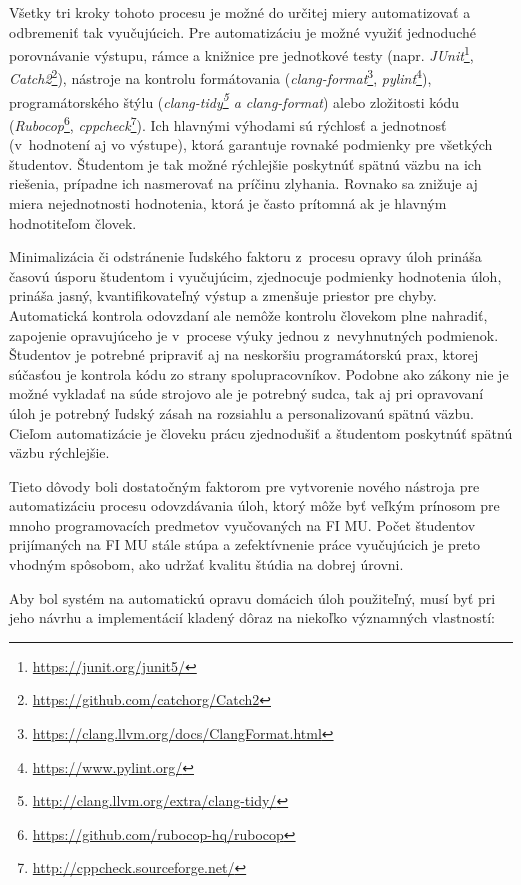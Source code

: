 \documentclass[
  digital, %
  oneside, %
  table,   %
  lof,     %
  lot,   %
]{fithesis3}
\newcommand*{\footurl}[1]{\footnote{\url{#1}}}
\begin{document}
Všetky tri kroky tohoto procesu je možné do určitej miery automatizovať a odbremeniť tak vyučujúcich. Pre automatizáciu je možné využiť jednoduché porovnávanie výstupu, rámce a knižnice pre jednotkové testy (napr. \emph{JUnit}\footnote{\url{https://junit.org/junit5/}}, \emph{Catch2}\footnote{\url{https://github.com/catchorg/Catch2}}), nástroje na kontrolu formátovania (\emph{clang-format}\footnote{\url{https://clang.llvm.org/docs/ClangFormat.html}}, \textit{pylint}\footnote{\url{https://www.pylint.org/}}), programátorského štýlu (\textit{clang-tidy\footnote{\url{http://clang.llvm.org/extra/clang-tidy/}} a clang-format}) alebo zložitosti kódu (\textit{Rubocop}\footnote{\url{https://github.com/rubocop-hq/rubocop}}, \textit{cppcheck}\footurl{http://cppcheck.sourceforge.net/}). Ich hlavnými výhodami sú rýchlosť a jednotnosť (v~hodnotení aj vo výstupe), ktorá garantuje rovnaké podmienky pre všetkých študentov. Študentom je tak možné rýchlejšie poskytnúť spätnú väzbu na ich riešenia, prípadne ich nasmerovať na príčinu zlyhania. Rovnako sa znižuje aj miera nejednotnosti hodnotenia, ktorá je často prítomná ak je hlavným hodnotiteľom človek.

Minimalizácia či odstránenie ľudského faktoru z~procesu opravy úloh prináša časovú úsporu študentom i vyučujúcim, zjednocuje podmienky hodnotenia úloh, prináša jasný, kvantifikovateľný výstup a zmenšuje priestor pre chyby. Automatická kontrola odovzdaní ale nemôže kontrolu človekom plne nahradiť, zapojenie opravujúceho je v~procese výuky jednou z~nevyhnutných podmienok. Študentov je potrebné pripraviť aj na neskoršiu programátorskú prax, ktorej súčasťou je kontrola kódu zo strany spolupracovníkov\cite{code_reviews_atlassian}. Podobne ako zákony nie je možné vykladať na súde strojovo ale je potrebný sudca, tak aj pri opravovaní úloh je potrebný ľudský zásah na rozsiahlu a personalizovanú spätnú väzbu\cite{code-feedback}. Cieľom automatizácie je človeku prácu zjednodušiť a študentom poskytnúť spätnú väzbu rýchlejšie.

Tieto dôvody boli dostatočným faktorom pre vytvorenie nového nástroja pre automatizáciu procesu odovzdávania úloh, ktorý môže byť veľkým prínosom pre mnoho programovacích predmetov vyučovaných na FI MU. Počet študentov prijímaných na FI MU stále stúpa a zefektívnenie práce vyučujúcich je preto vhodným spôsobom, ako udržať kvalitu štúdia na dobrej úrovni.

Aby bol systém na automatickú opravu domácich úloh použiteľný, musí byť pri jeho návrhu a implementácií kladený dôraz na niekoľko významných vlastností\cite{obrien-attributes-soa}:
\end{document}
